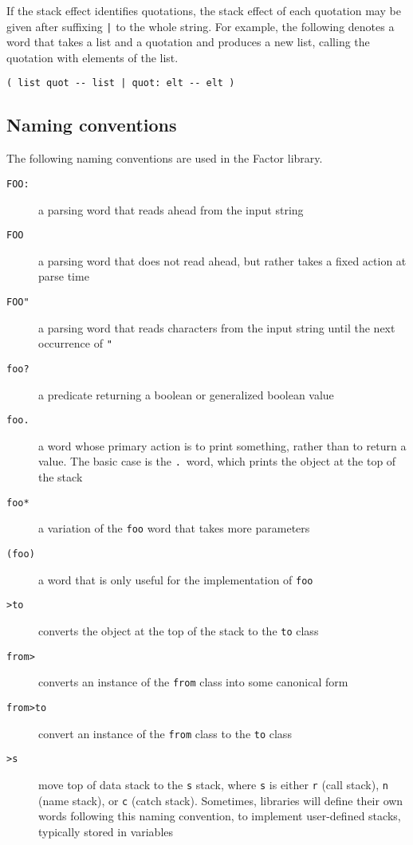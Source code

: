 \documentclass{book}
\begin{document}
If the stack effect identifies quotations, the stack effect of each quotation may be given after suffixing \texttt{|} to the whole string. For example, the following denotes a word that takes a list and a quotation and produces a new list, calling the quotation with elements of the list.
\begin{verbatim}
( list quot -- list | quot: elt -- elt )
\end{verbatim}

\subsection{Naming conventions}

The following naming conventions are used in the Factor library.

\begin{description}
\item[\texttt{FOO:}] a parsing word that reads ahead from the input string
\item[\texttt{FOO}] a parsing word that does not read ahead, but rather takes a fixed action at parse time
\item[\texttt{FOO"}] a parsing word that reads characters from the input string until the next occurrence of \texttt{"}
\item[\texttt{foo?}] a predicate returning a boolean or generalized boolean value
\item[\texttt{foo.}] a word whose primary action is to print something, rather than to return a value. The basic case is the \texttt{.}~word, which prints the object at the top of the stack
\item[\texttt{foo*}] a variation of the \texttt{foo} word that takes more parameters
\item[\texttt{(foo)}] a word that is only useful for the implementation of \texttt{foo}
\item[\texttt{>to}] converts the object at the top of the stack to the \texttt{to} class
\item[\texttt{from>}] converts an instance of the \texttt{from} class into some canonical form
\item[\texttt{from>to}] convert an instance of the \texttt{from} class to the \texttt{to} class
\item[\texttt{>s}] move top of data stack to the \texttt{s} stack, where \texttt{s} is either \texttt{r} (call stack), \texttt{n} (name stack), or \texttt{c} (catch stack). Sometimes, libraries will define their own words following this naming convention, to implement user-defined stacks, typically stored in variables

\end{description}
\end{document}
